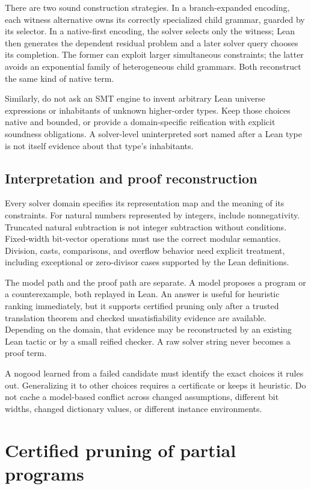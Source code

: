 There are two sound construction strategies. In a branch-expanded encoding, each witness alternative owns its correctly specialized child grammar, guarded by its selector. In a native-first encoding, the solver selects only the witness; Lean then generates the dependent residual problem and a later solver query chooses its completion. The former can exploit larger simultaneous constraints; the latter avoids an exponential family of heterogeneous child grammars. Both reconstruct the same kind of native term.

Similarly, do not ask an SMT engine to invent arbitrary Lean universe expressions or inhabitants of unknown higher-order types. Keep those choices native and bounded, or provide a domain-specific reification with explicit soundness obligations. A solver-level uninterpreted sort named after a Lean type is not itself evidence about that type's inhabitants.

\subsection{Interpretation and proof reconstruction}
Every solver domain specifies its representation map and the meaning of its constraints. For natural numbers represented by integers, include nonnegativity. Truncated natural subtraction is not integer subtraction without conditions. Fixed-width bit-vector operations must use the correct modular semantics. Division, casts, comparisons, and overflow behavior need explicit treatment, including exceptional or zero-divisor cases supported by the Lean definitions.

The model path and the proof path are separate. A model proposes a program or a counterexample, both replayed in Lean. An  answer is useful for heuristic ranking immediately, but it supports certified pruning only after a trusted translation theorem and checked unsatisfiability evidence are available. Depending on the domain, that evidence may be reconstructed by an existing Lean tactic or by a small reified checker. A raw solver string never becomes a proof term.

A nogood learned from a failed candidate must identify the exact choices it rules out. Generalizing it to other choices requires a certificate or keeps it heuristic. Do not cache a model-based conflict across changed assumptions, different bit widths, changed dictionary values, or different instance environments.

\section{Certified pruning of partial programs}
\label{sec:pruning}
